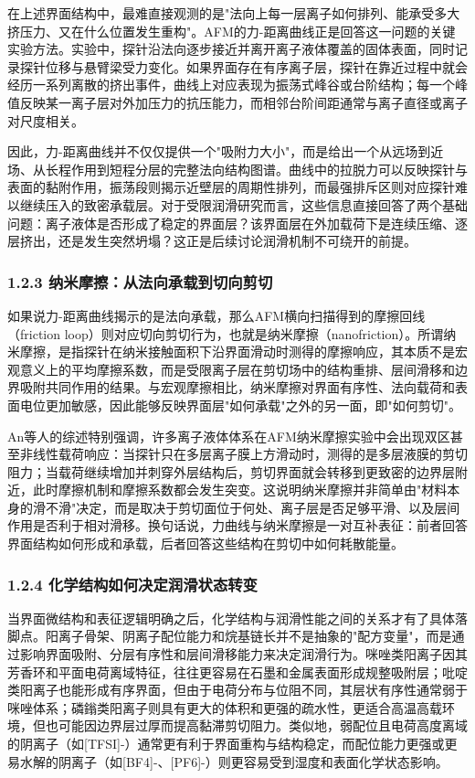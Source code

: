 在上述界面结构中，最难直接观测的是"法向上每一层离子如何排列、能承受多大挤压力、又在什么位置发生重构"。AFM的力-距离曲线正是回答这一问题的关键实验方法\cite{ref31}。实验中，探针沿法向逐步接近并离开离子液体覆盖的固体表面，同时记录探针位移与悬臂梁受力变化。如果界面存在有序离子层，探针在靠近过程中就会经历一系列离散的挤出事件，曲线上对应表现为振荡式峰谷或台阶结构；每一个峰值反映某一离子层对外加压力的抗压能力，而相邻台阶间距通常与离子直径或离子对尺度相关。

因此，力-距离曲线并不仅仅提供一个"吸附力大小"，而是给出一个从远场到近场、从长程作用到短程分层的完整法向结构图谱。曲线中的拉脱力可以反映探针与表面的黏附作用，振荡段则揭示近壁层的周期性排列，而最强排斥区则对应探针难以继续压入的致密承载层\cite{ref31}。对于受限润滑研究而言，这些信息直接回答了两个基础问题：离子液体是否形成了稳定的界面层？该界面层在外加载荷下是连续压缩、逐层挤出，还是发生突然坍塌？这正是后续讨论润滑机制不可绕开的前提。

\subsubsection{1.2.3 纳米摩擦：从法向承载到切向剪切}

如果说力-距离曲线揭示的是法向承载，那么AFM横向扫描得到的摩擦回线（friction loop）则对应切向剪切行为，也就是纳米摩擦（nanofriction）\cite{ref31}。所谓纳米摩擦，是指探针在纳米接触面积下沿界面滑动时测得的摩擦响应，其本质不是宏观意义上的平均摩擦系数，而是受限离子层在剪切场中的结构重排、层间滑移和边界吸附共同作用的结果。与宏观摩擦相比，纳米摩擦对界面有序性、法向载荷和表面电位更加敏感，因此能够反映界面层"如何承载"之外的另一面，即"如何剪切"。

An等人的综述特别强调，许多离子液体体系在AFM纳米摩擦实验中会出现双区甚至非线性载荷响应：当探针只在多层离子膜上方滑动时，测得的是多层液膜的剪切阻力；当载荷继续增加并刺穿外层结构后，剪切界面就会转移到更致密的边界层附近，此时摩擦机制和摩擦系数都会发生突变\cite{ref31}。这说明纳米摩擦并非简单由"材料本身的滑不滑"决定，而是取决于剪切面位于何处、离子层是否足够平滑、以及层间作用是否利于相对滑移。换句话说，力曲线与纳米摩擦是一对互补表征：前者回答界面结构如何形成和承载，后者回答这些结构在剪切中如何耗散能量。

\subsubsection{1.2.4 化学结构如何决定润滑状态转变}

当界面微结构和表征逻辑明确之后，化学结构与润滑性能之间的关系才有了具体落脚点。阳离子骨架、阴离子配位能力和烷基链长并不是抽象的"配方变量"，而是通过影响界面吸附、分层有序性和层间滑移能力来决定润滑行为。咪唑类阳离子因其芳香环和平面电荷离域特征，往往更容易在石墨和金属表面形成规整吸附层；吡啶类阳离子也能形成有序界面，但由于电荷分布与位阻不同，其层状有序性通常弱于咪唑体系；磷鎓类阳离子则具有更大的体积和更强的疏水性，更适合高温高载环境，但也可能因边界层过厚而提高黏滞剪切阻力\cite{ref22,ref23,ref24,ref26}。类似地，弱配位且电荷高度离域的阴离子（如{[}TFSI{]}-）通常更有利于界面重构与结构稳定，而配位能力更强或更易水解的阴离子（如{[}BF4{]}-、{[}PF6{]}-）则更容易受到湿度和表面化学状态影响\cite{ref23,ref24,ref27,ref28}。

